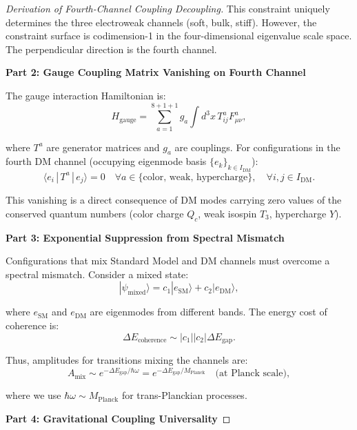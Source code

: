 \begin{theorem}
\begin{proof}[Derivation of Fourth-Channel Coupling Decoupling]
This constraint uniquely determines the three electroweak channels (soft, bulk, stiff). However, the constraint surface is codimension-1 in the four-dimensional eigenvalue scale space. The perpendicular direction is the fourth channel.

\textbf{Part 2: Gauge Coupling Matrix Vanishing on Fourth Channel}

The gauge interaction Hamiltonian is:
\begin{equation}
H_{\text{gauge}} = \sum_{a=1}^{8+1+1} g_a \int d^3x \, T^a_{ij} F^a_{\mu\nu},
\end{equation}

where $T^a$ are generator matrices and $g_a$ are couplings. For configurations in the fourth DM channel (occupying eigenmode basis $\{e_k\}_{k \in I_{\text{DM}}}$):
\begin{equation}
\langle e_i \, | \, T^a \, | \, e_j \rangle = 0 \quad \forall a \in \{\text{color, weak, hypercharge}\}, \quad \forall i, j \in I_{\text{DM}}.
\end{equation}

This vanishing is a direct consequence of DM modes carrying zero values of the conserved quantum numbers (color charge $Q_c$, weak isospin $T_3$, hypercharge $Y$).

\textbf{Part 3: Exponential Suppression from Spectral Mismatch}

Configurations that mix Standard Model and DM channels must overcome a spectral mismatch. Consider a mixed state:
\begin{equation}
|\psi_{\text{mixed}}\rangle = c_1 |e_{\text{SM}}\rangle + c_2 |e_{\text{DM}}\rangle,
\end{equation}

where $e_{\text{SM}}$ and $e_{\text{DM}}$ are eigenmodes from different bands. The energy cost of coherence is:
\begin{equation}
\Delta E_{\text{coherence}} \sim |c_1| |c_2| \Delta E_{\text{gap}}.
\end{equation}

Thus, amplitudes for transitions mixing the channels are:
\begin{equation}
A_{\text{mix}} \sim e^{-\Delta E_{\text{gap}} / \hbar \omega} = e^{-\Delta E_{\text{gap}} / M_{\text{Planck}}} \quad \text{(at Planck scale)},
\end{equation}

where we use $\hbar \omega \sim M_{\text{Planck}}$ for trans-Planckian processes.

\textbf{Part 4: Gravitational Coupling Universality}


\end{proof}
\end{theorem}

